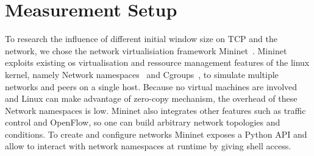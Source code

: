 \section{Measurement Setup}
\label{sec:measurement_setup}

To research the influence of different initial window size on TCP and the
network, we chose the network virtualisiation framework Mininet~\cite{mininet}.
Mininet exploits existing os virtualisation and ressource management features of
the linux kernel, namely Network namespaces~\cite{network_namespaces} and
Cgroups~\cite{cgroups}, to simulate multiple networks and peers on a single
host. Because no virtual machines are involved and Linux can make advantage of
zero-copy mechanism, the overhead of these Network namespaces is low.
Mininet also integrates other features such as traffic control and OpenFlow, so
one can build arbitrary network topologies and conditions. To create and
configure networks Mininet exposes a Python API and allow to interact with
network namespaces at runtime by giving shell access.


